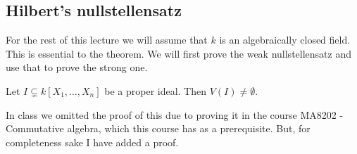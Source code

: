 \subsection{Hilbert's nullstellensatz}

For the rest of this lecture we will assume that $k$ is an algebraically closed field. This is essential to the theorem. We will first prove the weak nullstellensatz and use that to prove the strong one. 

\begin{theorem}
Let $I\subsetneq k[X_1, \ldots, X_n]$ be a proper ideal. Then $V(I)\neq \emptyset$. 
\end{theorem}
\label{thm:weak_nullstellensatz}
In class we omitted the proof of this due to proving it in the course MA8202 - Commutative algebra, which this course has as a prerequisite. But, for completeness sake I have added a proof. 
